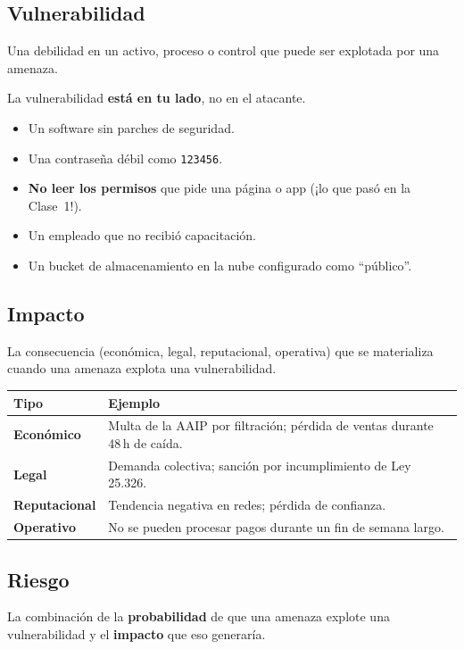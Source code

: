 \documentclass[12pt,a4paper]{article}
\renewcommand{\arraystretch}{1.25}
\begin{document}
\subsection{Vulnerabilidad}
\begin{cajaDefinicion}
Una debilidad en un activo, proceso o control que puede ser explotada por una amenaza.
\end{cajaDefinicion}

La vulnerabilidad \textbf{est\'a en tu lado}, no en el atacante.
\begin{itemize}[leftmargin=2em]
  \item Un software sin parches de seguridad.
  \item Una contrase\~na d\'ebil como \texttt{123456}.
  \item \textbf{No leer los permisos} que pide una p\'agina o app (¡lo que pas\'o en la Clase~1!).
  \item Un empleado que no recibi\'o capacitaci\'on.
  \item Un bucket de almacenamiento en la nube configurado como ``p\'ublico''.
\end{itemize}

\subsection{Impacto}
\begin{cajaDefinicion}
La consecuencia (econ\'omica, legal, reputacional, operativa) que se materializa
cuando una amenaza explota una vulnerabilidad.
\end{cajaDefinicion}

\renewcommand{\arraystretch}{1.5}
\begin{tabularx}{\textwidth}{>{\bfseries}p{3cm}X}
\toprule
\textbf{Tipo} & \textbf{Ejemplo} \\
\midrule
Econ\'omico & Multa de la AAIP por filtraci\'on; p\'erdida de ventas durante 48\,h de ca\'ida. \\
Legal     & Demanda colectiva; sanci\'on por incumplimiento de Ley 25.326. \\
Reputacional & Tendencia negativa en redes; p\'erdida de confianza. \\
Operativo & No se pueden procesar pagos durante un fin de semana largo. \\
\bottomrule
\end{tabularx}

\subsection{Riesgo}
\begin{cajaDefinicion}
La combinaci\'on de la \textbf{probabilidad} de que una amenaza explote una
vulnerabilidad y el \textbf{impacto} que eso generar\'ia.
\end{cajaDefinicion}
\end{document}
